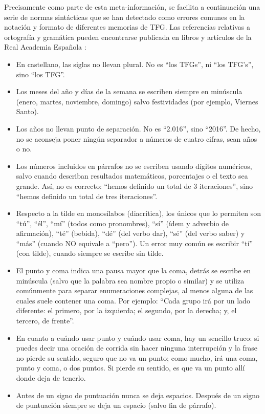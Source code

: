 \begin{shaded}
Precisamente como parte de esta meta-información, se facilita a continuación una serie de normas sintácticas que se han detectado como errores comunes en la notación y formato de diferentes memorias de \ac{TFG}. Las referencias relativas a ortografía y gramática pueden encontrarse publicada en libros y artículos de la Real Academia Española \cite{espanola2010ortografia,rae2016diccionario,real2005diccionario}:
\begin{itemize}
    \item En castellano, las siglas no llevan plural. No es ``los TFGs'', ni ``los TFG's'', sino ``los TFG''.
    \item Los meses del año y días de la semana se escriben siempre en minúscula (enero, martes, noviembre, domingo) salvo festividades (por ejemplo, Viernes Santo).
    \item Los años no llevan punto de separación. No es ``2.016'', sino ``2016''. De hecho, no se aconseja poner ningún separador a números de cuatro cifras, sean años o no.
    \item Los números incluidos en párrafos no se escriben usando dígitos numéricos, salvo cuando describan resultados matemáticos, porcentajes o el texto sea grande. Así, no es correcto: ``hemos definido un total de 3 iteraciones'', sino ``hemos definido un total de tres iteraciones''.
    \item Respecto a la tilde en monosílabos (diacrítica), los únicos que lo permiten son ``tú'', ``él'', ``mí'' (todos como pronombres), ``sí'' (ídem y adverbio de afirmación), ``té'' (bebida), ``dé'' (del verbo dar), ``sé'' (del verbo saber) y ``más'' (cuando NO equivale a ``pero''). Un error muy común es escribir ``tí'' (con tilde), cuando siempre se escribe sin tilde.
    \item El punto y coma indica una pausa mayor que la coma, detrás se escribe en minúscula (salvo que la palabra sea nombre propio o similar) y se utiliza comúnmente para separar enumeraciones complejas, al menos alguna de las cuales suele contener una coma. Por ejemplo: ``Cada grupo irá por un lado diferente: el primero, por la izquierda; el segundo, por la derecha; y, el tercero, de frente''.
    \item En cuanto a cuándo usar punto y cuándo usar coma, hay un sencillo truco: si puedes decir una oración de corrida sin hacer ninguna interrupción y la frase no pierde su sentido, seguro que no va un punto; como mucho, irá una coma, punto y coma, o dos puntos. Si pierde su sentido, es que va un punto allí donde deja de tenerlo.
    \item Antes de un signo de puntuación nunca se deja espacios. Después de un signo de puntuación siempre se deja un espacio (salvo fin de párrafo).

\end{itemize}
\end{shaded}
